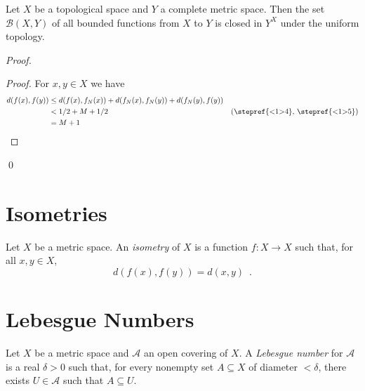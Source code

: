 \begin{thm}
  \label{thm:topology:metric:bounded_closed}
  Let $X$ be a topological space and $Y$ a complete metric space. Then the set $\mathcal{B}(X, Y)$ of all bounded functions from $X$ to $Y$ is closed in $Y^X$ under the uniform topology.
\end{thm}

\begin{proof}
  \pf
  \begin{proof}
    \pf
    For $x, y \in X$ we have
    \begin{align*}
      d(f(x), f(y)) & \leq d(f(x), f_N(x)) + d(f_N(x), f_N(y)) + d(f_N(y), f(y)) \\
      & < 1/2 + M + 1/2 & (\text{\stepref{<1>4}, \stepref{<1>5}})\\
      & = M + 1
    \end{align*}
  \end{proof}
  \qed
\end{proof}

\section{Isometries}

\begin{df}[Isometry]
  Let $X$ be a metric space. An \emph{isometry} of $X$ is a function $f : X
  \rightarrow X$ such that, for all $x, y \in X$,
  \[ d(f(x), f(y)) = d(x, y) \enspace . \]
\end{df}

\section{Lebesgue Numbers}

\begin{df}
  Let $X$ be a metric space and $\mathcal{A}$ an open covering of $X$. A
  \emph{Lebesgue number} for $\mathcal{A}$ is a real $\delta > 0$ such that,
  for every nonempty set $A \subseteq X$ of diameter $< \delta$, there exists
  $U \in \mathcal{A}$ such that $A \subseteq U$.
\end{df}

